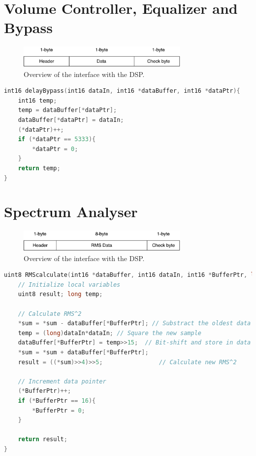 \section{Volume Controller, Equalizer and Bypass}

\begin{figure}[H]
\centering
\includegraphics[width=0.75\textwidth]{figures/communicationProtocolUART.pdf}
\caption{Overview of the interface with the DSP.}
\label{fig:communicationProtocolUART}
\end{figure}



\begin{lstlisting}[language=C, caption = {Delay function for bypass},label={listingByPass}]
int16 delayBypass(int16 dataIn, int16 *dataBuffer, int16 *dataPtr){
	int16 temp;
	temp = dataBuffer[*dataPtr];
	dataBuffer[*dataPtr] = dataIn;
	(*dataPtr)++;
	if (*dataPtr == 5333){
		*dataPtr = 0;
	}
	return temp;
}
\end{lstlisting}

\section{Spectrum Analyser}

\begin{figure}[H]
\centering
\includegraphics[width=0.75\textwidth]{figures/communicationProtocolUARTTransmit.pdf}
\caption{Overview of the interface with the DSP.}
\label{fig:communicationProtocolUARTTransmit}
\end{figure}


\begin{lstlisting}[language=C, caption = {Calculate RMS value},label={listingRMSuart}]
uint8 RMScalculate(int16 *dataBuffer, int16 dataIn, int16 *BufferPtr, long *sum){
	// Initialize local variables
	uint8 result; long temp;
	
	// Calculate RMS^2
	*sum = *sum - dataBuffer[*BufferPtr]; // Substract the oldest data from sum
	temp = (long)dataIn*dataIn;	// Square the new sample
	dataBuffer[*BufferPtr] = temp>>15;	// Bit-shift and store in data buffer
	*sum = *sum + dataBuffer[*BufferPtr];
	result = ((*sum)>>4)>>5;				// Calculate new RMS^2
	
	// Increment data pointer
	(*BufferPtr)++;
	if (*BufferPtr == 16){ 
		*BufferPtr = 0;
	}
	
	return result;
}
\end{lstlisting}




